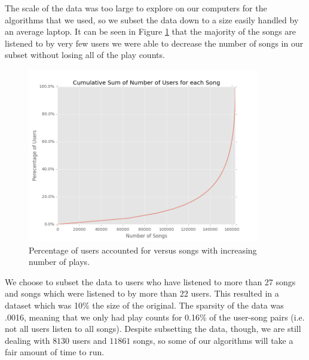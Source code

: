 \documentclass[11pt,preprint]{aastex}
\begin{document}
The scale of the data was too large to explore on our computers for the algorithms that we used, so we subset the data down to a size easily handled by an average laptop. 
It can be seen in Figure \ref{fig:csongs} that the majority of the songs are listened to by very few users we were able to decrease the number of songs in our subset without losing all of the play counts. 

\begin{figure}[H] %
   \centering
   \includegraphics[width=4in]{../plots/final/cumsum-songs.png} 
   \caption{Percentage of users accounted for versus songs with increasing number of plays.}\label{fig:csongs}
\end{figure}

We choose to subset the data to users who have listened to more than 27 songs and songs which were listened to by more than 22 users. This resulted in a dataset which was 10\% the size of the original. The sparsity of the data was .0016, meaning that we only had play counts for 0.16\% of the user-song pairs (i.e. not all users listen to all songs). Despite subsetting the data, though, we are still dealing with $8130$ users and $11861$ songs, so some of our algorithms will take a fair amount of time to run.


%
\end{document}
